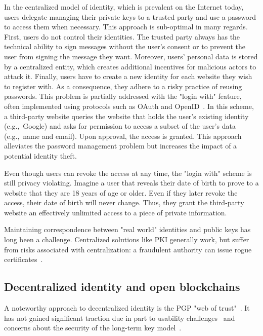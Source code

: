 In the centralized model of identity, which is prevalent on the Internet today, users delegate managing their private keys to a trusted party and use a password to access them when necessary.
This approach is sub-optimal in many regards.
First, users do not control their identities.
The trusted party always has the technical ability to sign messages without the user's consent or to prevent the user from signing the message they want.
Moreover, users' personal data is stored by a centralized entity, which creates additional incentives for malicious actors to attack it.
Finally, users have to create a new identity for each website they wish to register with.
As a consequence, they adhere to a risky practice of reusing passwords.
This problem is partially addressed with the "login with" feature, often implemented using protocols such as OAuth and OpenID~\cite{Dodanduwa2018}.
In this scheme, a third-party website queries the website that holds the user's existing identity (e.g.,~Google) and asks for permission to access a subset of the user's data (e.g.,~name and email).
Upon approval, the access is granted.
This approach alleviates the password management problem but increases the impact of a potential identity theft.

Even though users can revoke the access at any time, the "login with" scheme is still privacy violating.
Imagine a user that reveals their date of birth to prove to a website that they are 18 years of age or older.
Even if they later revoke the access, their date of birth will never change.
Thus, they grant the third-party website an effectively unlimited access to a piece of private information.

Maintaining correspondence between "real world" identities and public keys has long been a challenge.
Centralized solutions like PKI generally work, but suffer from risks associated with centralization: a fraudulent authority can issue rogue certificates~\cite{Amann2017}.


\subsection{Decentralized identity and open blockchains}

A noteworthy approach to decentralized identity is the PGP "web of trust"~\cite{Feisthammel2017}.
It has not gained significant traction due in part to usability challenges~\cite{Ruoti2015} and concerns about the security of the long-term key model~\cite{Valsorda2016}.


